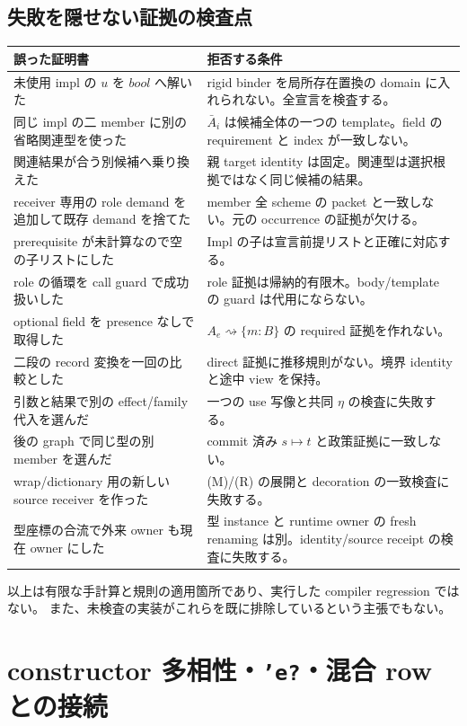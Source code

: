 \documentclass[11pt,a4paper]{article}
\newcommand{\Dir}{\mathrel{\rightsquigarrow}}
\begin{document}
\subsection{失敗を隠せない証拠の検査点}

\begin{longtable}{p{}p{}}
\toprule 誤った証明書 & 拒否する条件 \\
\midrule\endhead
未使用 impl の \(u\) を \(bool\) へ解いた & rigid binder を局所存在置換の domain に入れられない。全宣言を検査する。\\
同じ impl の二 member に別の省略関連型を使った & \(\bar A_i\) は候補全体の一つの template。field の requirement と index が一致しない。\\
関連結果が合う別候補へ乗り換えた & 親 target identity は固定。関連型は選択根拠ではなく同じ候補の結果。\\
receiver 専用の role demand を追加して既存 demand を捨てた & member 全 scheme の packet と一致しない。元の occurrence の証拠が欠ける。\\
prerequisite が未計算なので空の子リストにした & Impl の子は宣言前提リストと正確に対応する。\\
role の循環を call guard で成功扱いした & role 証拠は帰納的有限木。body/template の guard は代用にならない。\\
optional field を presence なしで取得した & \(A_e\Dir\{m:B\}\) の required 証拠を作れない。\\
二段の record 変換を一回の比較とした & direct 証拠に推移規則がない。境界 identity と途中 view を保持。\\
引数と結果で別の effect/family 代入を選んだ & 一つの use 写像と共同 \(\eta\) の検査に失敗する。\\
後の graph で同じ型の別 member を選んだ & commit 済み \(s\mapsto t\) と政策証拠に一致しない。\\
wrap/dictionary 用の新しい source receiver を作った & (M)/(R) の展開と decoration の一致検査に失敗する。\\
型座標の合流で外来 owner も現在 owner にした & 型 instance と runtime owner の fresh renaming は別。identity/source receipt の検査に失敗する。\\
\bottomrule
\end{longtable}

以上は有限な手計算と規則の適用箇所であり、実行した compiler regression ではない。
また、未検査の実装がこれらを既に排除しているという主張でもない。

\section{constructor 多相性・\texttt{'e?}・混合 row との接続}
\label{sec:extended-selection}
\end{document}
